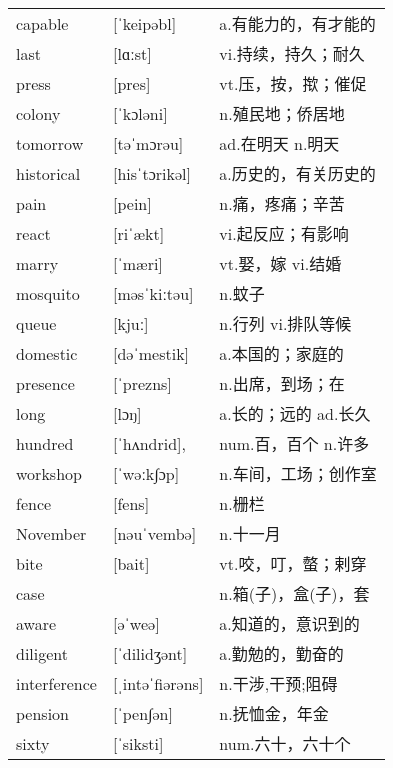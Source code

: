 \documentclass[a4paper]{article}
\begin{document}
\section{}
\begin{tabular}{l l l}

capable & [ˈkeipəbl] & a.有能力的，有才能的 \\
last & [lɑːst] & vi.持续，持久；耐久 \\
press & [pres] & vt.压，按，揿；催促 \\
colony & [ˈkɔləni] & n.殖民地；侨居地 \\
tomorrow & [təˈmɔrəu] & ad.在明天 n.明天 \\
historical & [hisˈtɔrikəl] & a.历史的，有关历史的 \\
pain & [pein] & n.痛，疼痛；辛苦 \\
react & [riˈækt] & vi.起反应；有影响 \\
marry & [ˈmæri] & vt.娶，嫁 vi.结婚 \\
mosquito & [məsˈkiːtəu] & n.蚊子 \\
queue & [kjuː] & n.行列 vi.排队等候 \\
domestic & [dəˈmestik] & a.本国的；家庭的 \\
presence & [ˈprezns] & n.出席，到场；在 \\
long & [lɔŋ] & a.长的；远的 ad.长久 \\
hundred & [ˈhʌndrid], & num.百，百个 n.许多 \\
workshop & [ˈwəːk∫ɔp] & n.车间，工场；创作室 \\
fence & [fens] & n.栅栏 \\
November & [nəuˈvembə] & n.十一月 \\
bite & [bait] & vt.咬，叮，螫；剌穿 \\
case &  & n.箱(子)，盒(子)，套 \\
aware & [əˈweə] & a.知道的，意识到的 \\
diligent & [ˈdilidʒənt] & a.勤勉的，勤奋的 \\
interference & [ˌintəˈfiərəns] & n.干涉,干预;阻碍 \\
pension & [ˈpen∫ən] & n.抚恤金，年金 \\
sixty & [ˈsiksti] & num.六十，六十个 \\

\end{tabular}
\end{document}
